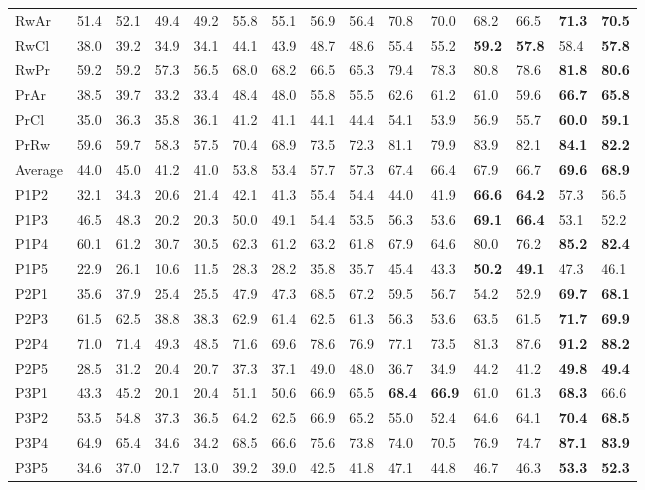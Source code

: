 \documentclass[journal]{IEEEtran}
\begin{document}
\begin{table*}[t]
\begin{tabular}{p{0.75cm}p{0.5cm}p{0.5cm}p{0.5cm}p{0.5cm}p{0.5cm}p{0.5cm}p{0.5cm}p{0.5cm}p{0.5cm}p{0.5cm}p{0.5cm}p{0.5cm}p{0.5cm}p{0.5cm}}
RwAr &51.4&52.1&49.4&49.2&55.8&55.1&56.9&56.4&70.8&70.0&68.2&66.5&\textbf{71.3}&\textbf{70.5}\\
RwCl &38.0&39.2&34.9&34.1&44.1&43.9&48.7&48.6&55.4&55.2&\textbf{59.2}&\textbf{57.8}&{58.4}&\textbf{57.8}\\
RwPr &59.2&59.2&57.3&56.5&68.0&68.2&66.5&65.3&79.4&78.3&80.8&78.6&\textbf{81.8}&\textbf{80.6}\\
PrAr &38.5&39.7&33.2&33.4&48.4&48.0&55.8&55.5&62.6&61.2&61.0&59.6&\textbf{66.7}&\textbf{65.8}\\
PrCl &35.0&36.3&35.8&36.1&41.2&41.1&44.1&44.4&54.1&53.9&56.9&55.7&\textbf{60.0}&\textbf{59.1}\\
PrRw &59.6&59.7&58.3&57.5&70.4&68.9&73.5&72.3&81.1&79.9&83.9&82.1&\textbf{84.1}&\textbf{82.2}\\
\hline
Average &44.0&45.0&41.2&41.0&53.8&53.4&57.7&57.3&67.4&66.4&67.9&66.7&\textbf{69.6}&\textbf{68.9}\\
\hline
\hline
P1P2  &32.1&34.3&20.6&21.4&42.1&41.3&55.4&54.4&44.0&41.9&\textbf{66.6}&\textbf{64.2}&57.3&56.5\\
P1P3 &46.5&48.3&20.2&20.3&50.0&49.1&54.4&53.5&56.3&53.6&\textbf{69.1}&\textbf{66.4}&53.1&52.2\\
P1P4 &60.1&61.2&30.7&30.5&62.3&61.2&63.2&61.8&67.9&64.6&{80.0}&{76.2}&\textbf{85.2}&\textbf{82.4}\\
P1P5 &22.9&26.1&10.6&11.5&28.3&28.2&35.8&35.7&45.4&43.3&\textbf{50.2}&\textbf{49.1}&47.3&46.1\\
P2P1 &35.6&37.9&25.4&25.5&47.9&47.3&{68.5}&67.2&59.5&56.7&54.2&52.9&\textbf{69.7}&\textbf{68.1}\\
P2P3 &61.5&62.5&38.8&38.3&62.9&61.4&62.5&61.3&56.3&53.6&63.5&61.5&\textbf{71.7}&\textbf{69.9}\\
P2P4 &71.0&71.4&49.3&48.5&71.6&69.6&78.6&76.9&77.1&73.5&81.3&87.6&\textbf{91.2}&\textbf{88.2}\\
P2P5 &28.5&31.2&20.4&20.7&37.3&37.1&{49.0}&{48.0}&36.7&34.9&{44.2}&{41.2}&\textbf{49.8}&\textbf{49.4}\\
P3P1 &43.3&45.2&20.1&20.4&51.1&50.6&66.9&65.5&\textbf{68.4}&\textbf{66.9}&61.0&61.3&\textbf{68.3}&{66.6}\\
P3P2 &53.5&54.8&37.3&36.5&64.2&62.5&66.9&65.2&55.0&52.4&64.6&64.1&\textbf{70.4}&\textbf{68.5}\\
P3P4 &64.9&65.4&34.6&34.2&68.5&66.6&75.6&73.8&74.0&70.5&76.9&74.7&\textbf{87.1}&\textbf{83.9}\\
P3P5 &34.6&37.0&12.7&13.0&39.2&39.0&42.5&41.8&47.1&44.8&46.7&46.3&\textbf{53.3}&\textbf{52.3}\\

\end{tabular}
\end{table*}
\end{document}
